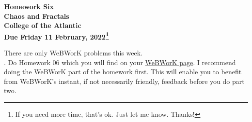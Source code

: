\documentclass[12pt]{article}
\begin{document}
\pagestyle{empty}
 
\begin{center}
{\LARGE {\bf Homework Six}}\\
\bigskip
{\Large {\bf Chaos and Fractals}}\\
\bigskip
{\Large {\bf College of the Atlantic}}\\
\bigskip
{ {\bf Due Friday 11 February, 2022\footnote{If you need more time,
      that's ok. Just let me know. Thanks!}}}\\  
\end{center}
\medskip



\noindent There are only WeBWorK problems this week.\\


.
Do Homework 06 which you will find
on your
\href{https://webwork.runestone.academy/webwork2/coa-feldman-es1026i-winter-2022}{WeBWorK
  page}.  I recommend doing the WeBWorK part of the 
homework first.  This will enable you to benefit from WeBWorK's
instant, if not necessarily friendly, feedback before you do part two.\\
\end{document}
